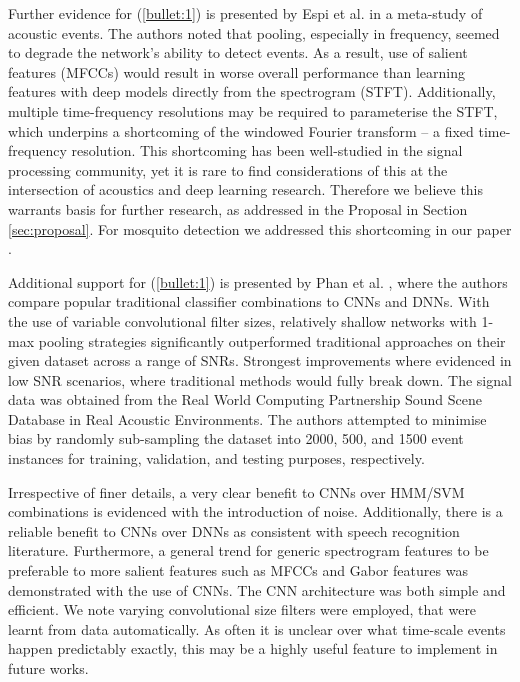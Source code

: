 \documentclass[12pt]{llncs}
\begin{document}
Further evidence for (\ref{bullet:1}) is presented by Espi et al. \cite{espi2015exploiting} in a meta-study of acoustic events. The authors noted that pooling, especially in frequency, seemed to degrade the network's ability to detect events. As a result, use of salient features (MFCCs) would result in worse overall performance than learning features with deep models directly from the spectrogram (STFT). Additionally, multiple time-frequency resolutions may be required to parameterise the STFT, which underpins a shortcoming of the windowed Fourier transform -- a fixed time-frequency resolution. This shortcoming has been well-studied in the signal processing community, yet it is rare to find considerations of this at the intersection of acoustics and deep learning research. Therefore we believe this warrants basis for further research, as addressed in the Proposal in Section \ref{sec:proposal}. For mosquito detection we addressed this shortcoming in our paper \cite[Section 2.2]{kiskin2017mosquito}.


Additional support for (\ref{bullet:1}) is presented by Phan et al. \cite{phan2016robust}, where the authors compare popular traditional classifier combinations to CNNs and DNNs. 
With the use of variable convolutional filter sizes, relatively shallow networks with  1-max pooling strategies significantly outperformed traditional approaches on their given dataset across a range of SNRs. Strongest improvements where evidenced in low SNR scenarios, where traditional methods would fully break down. The signal data was obtained from the Real World Computing Partnership Sound Scene Database in Real Acoustic Environments. The authors attempted to minimise bias by randomly sub-sampling the dataset into  2000, 500, and 1500 event instances for training, validation, and testing purposes, respectively. 

Irrespective of finer details, a very clear benefit to CNNs over HMM/SVM combinations is evidenced with the introduction of noise. Additionally, there is a reliable benefit to CNNs over DNNs as consistent with speech recognition literature. Furthermore, a general trend for generic spectrogram features to be preferable to more salient features such as MFCCs and Gabor features was demonstrated with the use of CNNs. The CNN architecture was both simple and efficient. We note varying convolutional size filters were employed, that were learnt from data automatically. As often it is unclear over what time-scale events happen predictably exactly, this may be a highly useful feature to implement in future works.
\end{document}
